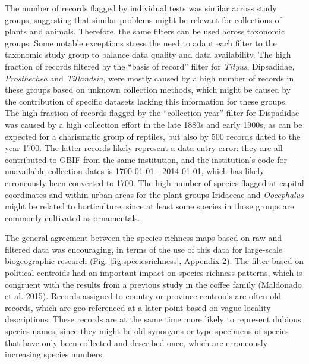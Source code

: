 \documentclass[fleqn,10pt,lineno]{wlpeerj} %
\begin{document}
The number of records flagged by individual tests was similar across study groups, suggesting that similar problems might be relevant for collections of plants and animals. Therefore, the same filters can be used across taxonomic groups. Some notable exceptions stress the need to adapt each filter to the taxonomic study group to balance data quality and data availability. The high fraction of records filtered by the ``basis of record'' filter for \emph{Tityus}, Dipsadidae, \emph{Prosthechea} and \emph{Tillandsia}, were mostly caused by a high number of records in these groups based on unknown collection methods, which might be caused by the contribution of specific datasets lacking this information for these groups. The high fraction of records flagged by the ``collection year'' filter for Dispadidae was caused by a high collection effort in the late 1880s and early 1900s, as can be expected for a charismatic group of reptiles, but also by 500 records dated to the year 1700. The latter records likely represent a data entry error: they are all contributed to GBIF from the same institution, and the institution's code for unavailable collection dates is 1700-01-01 - 2014-01-01, which has likely erroneously been converted to 1700. The high number of species flagged at capital coordinates and within urban areas for the plant groups Iridaceae and \emph{Oocephalus} might be related to horticulture, since at least some species in those groups are commonly cultivated as ornamentals.

The general agreement between the species richness maps based on raw and filtered data was encouraging, in terms of the use of this data for large-scale biogeographic research (Fig. \ref{fig:speciesrichness}, Appendix 2). The filter based on political centroids had an important impact on species richness patterns, which is congruent with the results from a previous study in the coffee family (Maldonado et al. 2015). Records assigned to country or province centroids are often old records, which are geo-referenced at a later point based on vague locality descriptions. These records are at the same time more likely to represent dubious species names, since they might be old synonyms or type specimens of species that have only been collected and described once, which are erroneously increasing species numbers.
\end{document}
